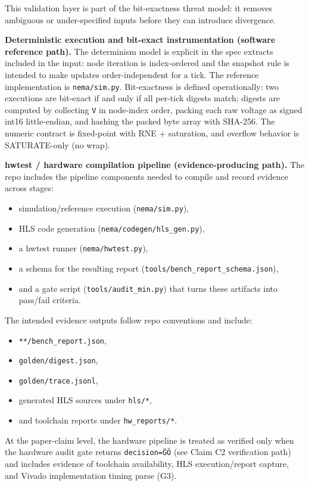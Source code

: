 This validation layer is part of the bit-exactness threat model: it removes ambiguous or under-specified inputs before they can introduce divergence.

\textbf{Deterministic execution and bit-exact instrumentation (software reference path).}
The determinism model is explicit in the spec extracts included in the input: node iteration is index-ordered and the snapshot rule is intended to make updates order-independent for a tick. The reference implementation is \texttt{nema/sim.py}. Bit-exactness is defined operationally: two executions are bit-exact if and only if all per-tick digests match; digests are computed by collecting \texttt{V} in node-index order, packing each raw voltage as signed int16 little-endian, and hashing the packed byte array with SHA-256. The numeric contract is fixed-point with RNE + saturation, and overflow behavior is SATURATE-only (no wrap).

\textbf{hwtest / hardware compilation pipeline (evidence-producing path).}
The repo includes the pipeline components needed to compile and record evidence across stages:
\begin{itemize}
\item simulation/reference execution (\texttt{nema/sim.py}),
\item HLS code generation (\texttt{nema/codegen/hls\_gen.py}),
\item a hwtest runner (\texttt{nema/hwtest.py}),
\item a schema for the resulting report (\texttt{tools/bench\_report\_schema.json}),
\item and a gate script (\texttt{tools/audit\_min.py}) that turns these artifacts into pass/fail criteria.
\end{itemize}

The intended evidence outputs follow repo conventions and include:
\begin{itemize}
\item \texttt{**/bench\_report.json},
\item \texttt{golden/digest.json},
\item \texttt{golden/trace.jsonl},
\item generated HLS sources under \texttt{hls/*},
\item and toolchain reports under \texttt{hw\_reports/*}.
\end{itemize}

At the paper-claim level, the hardware pipeline is treated as verified only when the hardware audit gate returns \texttt{decision=\"GO\"} (see Claim C2 verification path) and includes evidence of toolchain availability, HLS execution/report capture, and Vivado implementation timing parse (G3).

